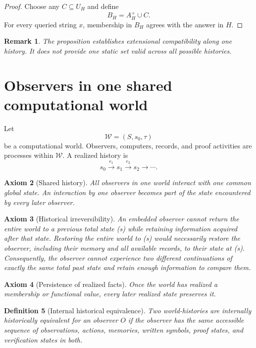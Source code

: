 \documentclass[11pt]{article}
\newtheorem{definition}{Definition}[section]
\newtheorem{axiom}[definition]{Axiom}
\newtheorem{remark}[definition]{Remark}
\newcommand{\World}{\mathcal W}
\begin{document}
\begin{proof}
Choose any \(C\subseteq U_H\) and define
\[
  B_H=A_H^+\cup C.
\]
For every queried string \(x\), membership in \(B_H\) agrees with the answer in \(H\).
\end{proof}

\begin{remark}
The proposition establishes extensional compatibility along one history.  It does not provide
one static set valid across all possible histories.
\end{remark}

 

 

 

\section{Observers in one shared computational world}

Let
\[
  \World=(S,s_0,\tau)
\]
be a computational world.  Observers, computers, records, and proof activities are processes
within \(\World\).  A realized history is
\[
s_0\xrightarrow{e_1}s_1\xrightarrow{e_2}s_2\longrightarrow\cdots .
\]

\begin{axiom}[Shared history]\label{ax:shared}
All observers in one world interact with one common global state.  An interaction by one
observer becomes part of the state encountered by every later observer.
\end{axiom}

\begin{axiom}[Historical irreversibility]\label{ax:irreversible}
An embedded observer cannot return the entire world to a previous total state (s) while retaining information acquired after that state. Restoring the entire world to (s) would necessarily restore the observer, including their memory and all available records, to their state at (s). Consequently, the observer cannot experience two different continuations of exactly the same total past state and retain enough information to compare them.
\end{axiom}

 

\begin{axiom}[Persistence of realized facts]\label{ax:persist}
Once the world has realized a membership or functional value, every later realized state
preserves it.
\end{axiom}

\begin{definition}[Internal historical equivalence]
Two world-histories are internally historically equivalent for an observer \(O\) if the
observer has the same accessible sequence of observations, actions, memories, written symbols,
proof states, and verification states in both.
\end{definition}
\end{document}
